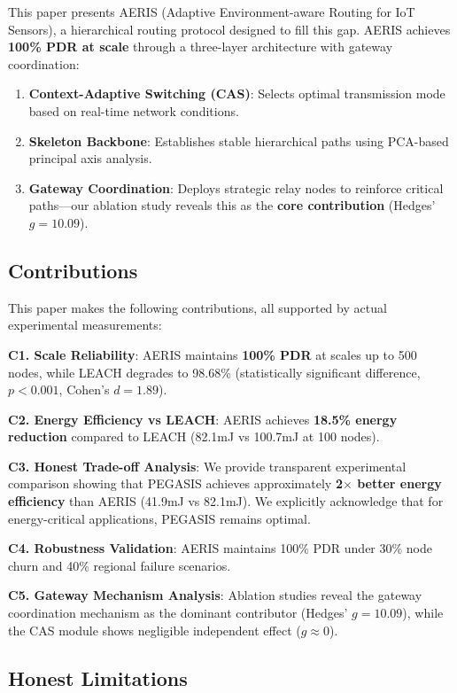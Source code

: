 This paper presents AERIS (Adaptive Environment-aware Routing for IoT Sensors),
a hierarchical routing protocol designed to fill this gap. AERIS achieves
\textbf{100\% PDR at scale} through a three-layer architecture with gateway
coordination:

\begin{enumerate}
    \item \textbf{Context-Adaptive Switching (CAS)}: Selects optimal
    transmission mode based on real-time network conditions.
    \item \textbf{Skeleton Backbone}: Establishes stable hierarchical paths
    using PCA-based principal axis analysis.
    \item \textbf{Gateway Coordination}: Deploys strategic relay nodes to
    reinforce critical paths---our ablation study reveals this as the
    \textbf{core contribution} (Hedges' $g=10.09$).
\end{enumerate}

\subsection{Contributions}

This paper makes the following contributions, all supported by actual
experimental measurements:

\textbf{C1. Scale Reliability}: AERIS maintains \textbf{100\% PDR} at scales
up to 500 nodes, while LEACH degrades to 98.68\% (statistically significant
difference, $p<0.001$, Cohen's $d=1.89$).

\textbf{C2. Energy Efficiency vs LEACH}: AERIS achieves \textbf{18.5\% energy
reduction} compared to LEACH (82.1mJ vs 100.7mJ at 100 nodes).

\textbf{C3. Honest Trade-off Analysis}: We provide transparent experimental
comparison showing that PEGASIS achieves approximately \textbf{2$\times$ better
energy efficiency} than AERIS (41.9mJ vs 82.1mJ). We explicitly acknowledge
that for energy-critical applications, PEGASIS remains optimal.

\textbf{C4. Robustness Validation}: AERIS maintains 100\% PDR under 30\% node
churn and 40\% regional failure scenarios.

\textbf{C5. Gateway Mechanism Analysis}: Ablation studies reveal the gateway
coordination mechanism as the dominant contributor (Hedges' $g=10.09$), while
the CAS module shows negligible independent effect ($g\approx 0$).

\subsection{Honest Limitations}

